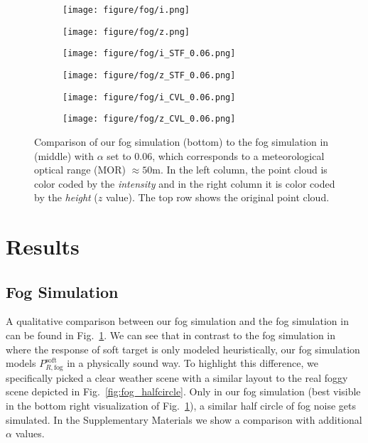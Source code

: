 \documentclass[10pt,twocolumn,letterpaper]{article}
\begin{document}
\begin{figure}
     \centering
     \begin{subfigure}[b]{0.495\linewidth}
         \centering
         \texttt{[image: figure/fog/i.png]}
     \end{subfigure}
     \hfill
     \begin{subfigure}[b]{0.495\linewidth}
         \centering
         \texttt{[image: figure/fog/z.png]}
     \end{subfigure}
     \begin{subfigure}[b]{0.495\linewidth}
         \centering
         \texttt{[image: figure/fog/i\_STF\_0.06.png]}
     \end{subfigure}
     \hfill
     \begin{subfigure}[b]{0.495\linewidth}
         \centering
         \texttt{[image: figure/fog/z\_STF\_0.06.png]}
     \end{subfigure}
     \begin{subfigure}[b]{0.495\linewidth}
         \centering
         \texttt{[image: figure/fog/i\_CVL\_0.06.png]}
     \end{subfigure}
     \hfill
     \begin{subfigure}[b]{0.495\linewidth}
         \centering
         \texttt{[image: figure/fog/z\_CVL\_0.06.png]}
     \end{subfigure}
     \caption{Comparison of our fog simulation (bottom) to the fog simulation in~\cite{STF} (middle) with $\alpha$ set to $0.06$, which corresponds to a meteorological optical range (MOR) $\approx50$m. 
     In the left column, the point cloud is color coded by the \textit{intensity} and in the right column it is color coded by the \textit{height} ($z$ value). 
     The top row shows the original point cloud.}
     \label{fig:fog_comparison}
\end{figure}
 \section{Results}
\label{sec:results}

\subsection{Fog Simulation}
\label{sec:fog_results}

A qualitative comparison between our fog simulation and the fog simulation in~\cite{STF} can be found in Fig.~\ref{fig:fog_comparison}.  We can see that in contrast to the fog simulation in~\cite{STF} where the response of soft target is only modeled heuristically, our fog simulation models $P^{\text{soft}}_{R,\text{fog}}$ in a physically sound way. To highlight this difference, we specifically picked a clear weather scene with a similar layout to the real foggy scene depicted in Fig.~\ref{fig:fog_halfcircle}. Only in our fog simulation (best visible in the bottom right visualization of Fig.~\ref{fig:fog_comparison}), a similar half circle of fog noise gets simulated. In the Supplementary Materials we show a comparison with additional $\alpha$ values.
\end{document}
